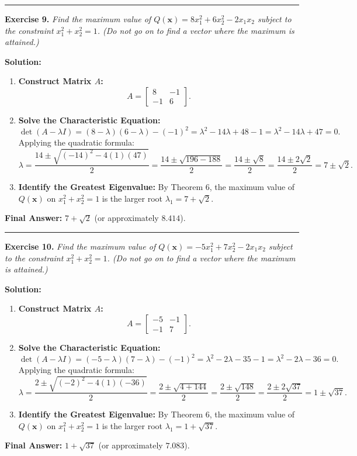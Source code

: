 \documentclass[11pt, letterpaper]{article}
\theoremstyle{definition}
\theoremstyle{remark}
\begin{document}
\medskip
\hrule
\medskip

\textbf{Exercise 9.} \emph{Find the maximum value of $Q(\mathbf{x}) = 8x_1^2 + 6x_2^2 - 2x_1x_2$ subject to the constraint $x_1^2 + x_2^2 = 1$. (Do not go on to find a vector where the maximum is attained.)}

\textbf{Solution:}
\begin{enumerate}[label=\textbf{Step \arabic*:}]
    \item \textbf{Construct Matrix $A$:}
    \[
    A = \begin{bmatrix} 8 & -1 \\ -1 & 6 \end{bmatrix}.
    \]
    \item \textbf{Solve the Characteristic Equation:}
    \[
    \det(A - \lambda I) = (8 - \lambda)(6 - \lambda) - (-1)^2 = \lambda^2 - 14\lambda + 48 - 1 = \lambda^2 - 14\lambda + 47 = 0.
    \]
    Applying the quadratic formula:
    \[
    \lambda = \frac{14 \pm \sqrt{(-14)^2 - 4(1)(47)}}{2} = \frac{14 \pm \sqrt{196 - 188}}{2} = \frac{14 \pm \sqrt{8}}{2} = \frac{14 \pm 2\sqrt{2}}{2} = 7 \pm \sqrt{2}.
    \]
    \item \textbf{Identify the Greatest Eigenvalue:}
    By Theorem 6, the maximum value of $Q(\mathbf{x})$ on $x_1^2 + x_2^2 = 1$ is the larger root $\lambda_1 = 7 + \sqrt{2}$.
\end{enumerate}
\textbf{Final Answer:} $7 + \sqrt{2}$ (or approximately $8.414$).

\medskip
\hrule
\medskip

\textbf{Exercise 10.} \emph{Find the maximum value of $Q(\mathbf{x}) = -5x_1^2 + 7x_2^2 - 2x_1x_2$ subject to the constraint $x_1^2 + x_2^2 = 1$. (Do not go on to find a vector where the maximum is attained.)}

\textbf{Solution:}
\begin{enumerate}[label=\textbf{Step \arabic*:}]
    \item \textbf{Construct Matrix $A$:}
    \[
    A = \begin{bmatrix} -5 & -1 \\ -1 & 7 \end{bmatrix}.
    \]
    \item \textbf{Solve the Characteristic Equation:}
    \[
    \det(A - \lambda I) = (-5 - \lambda)(7 - \lambda) - (-1)^2 = \lambda^2 - 2\lambda - 35 - 1 = \lambda^2 - 2\lambda - 36 = 0.
    \]
    Applying the quadratic formula:
    \[
    \lambda = \frac{2 \pm \sqrt{(-2)^2 - 4(1)(-36)}}{2} = \frac{2 \pm \sqrt{4 + 144}}{2} = \frac{2 \pm \sqrt{148}}{2} = \frac{2 \pm 2\sqrt{37}}{2} = 1 \pm \sqrt{37}.
    \]
    \item \textbf{Identify the Greatest Eigenvalue:}
    By Theorem 6, the maximum value of $Q(\mathbf{x})$ on $x_1^2 + x_2^2 = 1$ is the larger root $\lambda_1 = 1 + \sqrt{37}$.
\end{enumerate}
\textbf{Final Answer:} $1 + \sqrt{37}$ (or approximately $7.083$).
\end{document}
